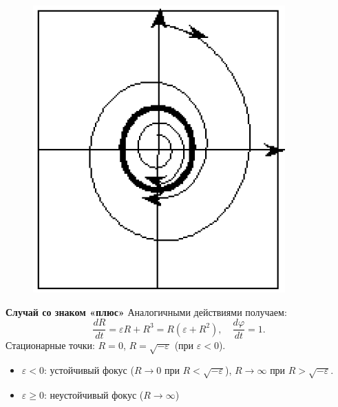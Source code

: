 \begin{figure}[H]
\begin{minipage}{0.2\textwidth}
		\end{minipage}
		\begin{minipage}{0.19\textwidth}
			\includegraphics[width=\textwidth]{img/10_06}
		\end{minipage}
	\end{figure}
	\vspace{-1em}
	\textbf{Случай со знаком «плюс»}
	\newline
	Аналогичными действиями получаем:
	\begin{equation}
		\frac{d R}{d t} = \varepsilon R + R^3 = R (\varepsilon + R^2), \quad \frac{d \varphi}{d t} = 1.
	\end{equation}
	Стационарные точки: \( R = 0 \), \( R = \sqrt{-\varepsilon} \) (при \(\varepsilon < 0\)).  
	\begin{itemize}
		\item \(\varepsilon < 0\): устойчивый фокус (\( R \to 0 \) при \( R < \sqrt{-\varepsilon} \)), \( R \to \infty \) при \( R > \sqrt{-\varepsilon} \).
		\item \(\varepsilon \geq 0\): неустойчивый фокус (\( R \to \infty \))
	\end{itemize}

